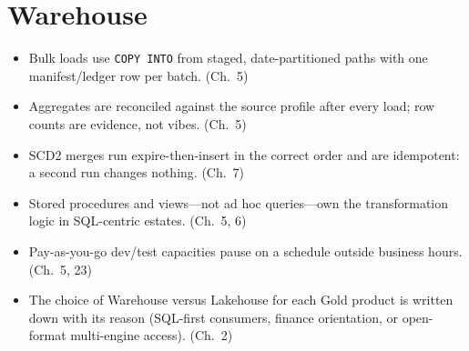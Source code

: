 \section{Warehouse}
%
\begin{itemize}
    \item[$\square$] Bulk loads use \texttt{COPY INTO} from staged, date-partitioned paths with
    one manifest/ledger row per batch. (Ch.~5)
    \item[$\square$] Aggregates are reconciled against the source profile after every load;
    row counts are evidence, not vibes. (Ch.~5)
    \item[$\square$] SCD2 merges run expire-then-insert in the correct order and are
    idempotent: a second run changes nothing. (Ch.~7)
    \item[$\square$] Stored procedures and views---not ad hoc queries---own the transformation
    logic in SQL-centric estates. (Ch.~5, 6)
    \item[$\square$] Pay-as-you-go dev/test capacities pause on a schedule outside business
    hours. (Ch.~5, 23)
    \item[$\square$] The choice of Warehouse versus Lakehouse for each Gold product is written
    down with its reason (SQL-first consumers, finance orientation, or open-format
    multi-engine access). (Ch.~2)
\end{itemize}

